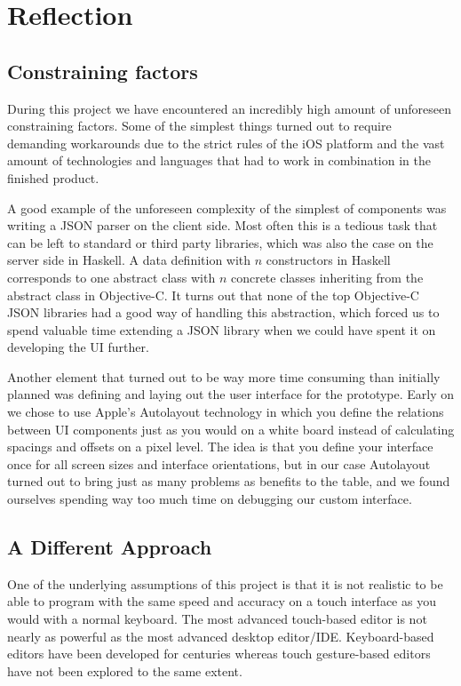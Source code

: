 \section{Reflection}
\label{sec:Reflection}

\subsection{Constraining factors}
During this project we have encountered an incredibly high amount of unforeseen constraining factors. Some of the simplest things turned out to require demanding workarounds due to the strict rules of the iOS platform and the vast amount of technologies and languages that had to work in combination in the finished product.

A good example of the unforeseen complexity of the simplest of components was writing a JSON parser on the client side. Most often this is a tedious task that can be left to standard or third party libraries, which was also the case on the server side in Haskell. A data definition with $n$ constructors in Haskell corresponds to one abstract class with $n$ concrete classes inheriting from the abstract class in Objective-C. It turns out that none of the top Objective-C JSON libraries had a good way of handling this abstraction, which forced us to spend valuable time extending a JSON library when we could have spent it on developing the UI further.

Another element that turned out to be way more time consuming than initially planned was defining and laying out the user interface for the prototype. Early on we chose to use Apple's Autolayout technology in which you define the relations between UI components just as you would on a white board instead of calculating spacings and offsets on a pixel level. The idea is that you define your interface once for all screen sizes and interface orientations, but in our case Autolayout turned out to bring just as many problems as benefits to the table, and we found ourselves spending way too much time on debugging our custom interface.

\subsection{A Different Approach}
One of the underlying assumptions of this project is that it is not realistic to be able to program with the same speed and accuracy on a touch interface as you would with a normal keyboard. The most advanced touch-based editor is not nearly as powerful as the most advanced desktop editor/IDE. Keyboard-based editors have been developed for centuries whereas touch gesture-based editors have not been explored to the same extent. 


